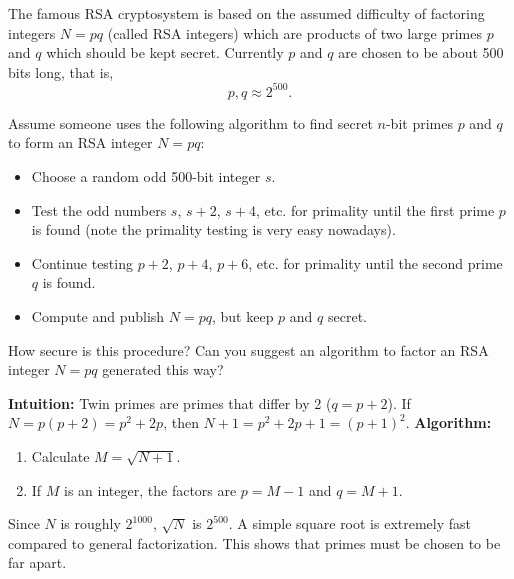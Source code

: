 \begin{exercise}
\label{applied:2012:8}
The famous RSA cryptosystem is based on the assumed difficulty of factoring integers $N=pq$ (called RSA integers) which are products of two large primes $p$ and $q$ which should be kept secret. Currently $p$ and $q$ are chosen to be about 500 bits long, that is,
\[
p,q\approx 2^{500}.
\]

Assume someone uses the following algorithm to find secret $n$-bit primes $p$ and $q$ to form an RSA integer $N=pq$:
\begin{itemize}
    \item Choose a random odd 500-bit integer $s$.
    \item Test the odd numbers $s$, $s+2$, $s+4$, etc. for primality until the first prime $p$ is found (note the primality testing is very easy nowadays).
    \item Continue testing $p+2$, $p+4$, $p+6$, etc. for primality until the second prime $q$ is found.
    \item Compute and publish $N=pq$, but keep $p$ and $q$ secret.
\end{itemize}
How secure is this procedure? Can you suggest an algorithm to factor an RSA integer $N=pq$ generated this way?
\end{exercise}

\begin{solution}
\textbf{Intuition:} Twin primes are primes that differ by 2 ($q = p+2$). If $N = p(p+2) = p^2 + 2p$, then $N+1 = p^2 + 2p + 1 = (p+1)^2$.
\textbf{Algorithm:}
\begin{enumerate}
    \item Calculate $M = \sqrt{N+1}$.
    \item If $M$ is an integer, the factors are $p = M-1$ and $q = M+1$.
\end{enumerate}
Since $N$ is roughly $2^{1000}$, $\sqrt{N}$ is $2^{500}$. A simple square root is extremely fast compared to general factorization. This shows that primes must be chosen to be far apart.
\end{solution}

